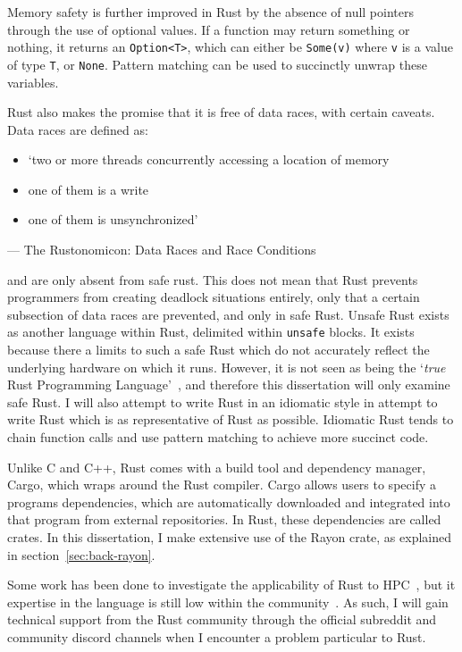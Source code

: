 Memory safety is further improved in Rust by the absence of null pointers through the use of optional values. If a function may return something or nothing, it returns an \texttt{Option<T>}, which can either be \texttt{Some(v)} where \texttt{v} is a value of type \texttt{T}, or \texttt{None}. Pattern matching can be used to succinctly unwrap these variables.

Rust also makes the promise that it is free of data races, with certain caveats. Data races are defined as:
\begin{itemize}
    \item `two or more threads concurrently accessing a location of memory
    \item one of them is a write
    \item one of them is unsynchronized'
\end{itemize}
\begin{flushright}
--- The Rustonomicon: Data Races and Race Conditions~\cite{NomRace}
\end{flushright}

and are only absent from safe rust. This does not mean that Rust prevents programmers from creating deadlock situations entirely, only that a certain subsection of data races are prevented, and only in safe Rust. Unsafe Rust exists as another language within Rust, delimited within \texttt{unsafe} blocks. It exists because there a limits to such a safe Rust which do not accurately reflect the underlying hardware on which it runs. However, it is not seen as being the `\textit{true} Rust Programming Language'~\cite{NomSafe}, and therefore this dissertation will only examine safe Rust. I will also attempt to write Rust in an idiomatic style in attempt to write Rust which is as representative of Rust as possible. Idiomatic Rust tends to chain function calls and use pattern matching to achieve more succinct code.

Unlike C and C++, Rust comes with a build tool and dependency manager, Cargo, which wraps around the Rust compiler. Cargo allows users to specify a programs dependencies, which are automatically downloaded and integrated into that program from external repositories. In Rust, these dependencies are called crates. In this dissertation, I make extensive use of the Rayon crate, as explained in section~\ref{sec:back-rayon}.

Some work has been done to investigate the applicability of Rust to HPC~, but it expertise in the language is still low within the community~. As such, I will gain technical support from the Rust community through the official subreddit and community discord channels when I encounter a problem particular to Rust.

